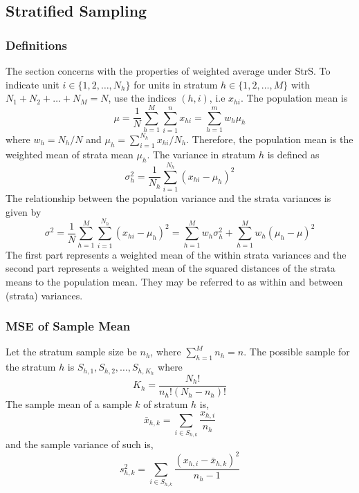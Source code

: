 \subsection{Stratified Sampling}
\subsubsection{Definitions}
The section concerns with the properties of weighted average under StrS. To indicate unit $i\in\{1,2,\ldots,N_h\}$ for units in stratum $h\in\{1,2,\ldots,M\}$ with $N_1+N_2+\ldots+N_M=N$, use the indices $(h,i)$, i.e 
$x_{hi}$. The population mean is
\begin{equation}
    \mu=\frac1N\sum_{h=1}^{M}\sum_{i=1}^{n}x_{hi}=\sum_{h=1}^{m}w_h\mu_h
\end{equation}
where $w_h=N_h/N$ and $\mu_h=\sum_{i=1}^{N_h}x_{hi}/N_h$. Therefore, the population mean is the weighted mean of strata mean $\mu_h$. The variance in stratum $h$ is defined as 
\begin{equation}
    \sigma^2_h=\frac{1}{N_h}\sum_{i=1}^{N_h}(x_{hi}-\mu_h)^2
\end{equation}
The relationship between the population variance and the strata variances is given by
\begin{equation}
    \sigma^2=\frac1N\sum_{h=1}^{M}\sum_{i=1}^{N_h}(x_{hi}-\mu_h)^2=\sum_{h=1}^{M}w_h\sigma^2_h+\sum_{h=1}^{M}w_h(\mu_h-\mu)^2
\end{equation}
The first part represents a weighted mean of the within strata variances and the second part represents a weighted mean of the squared distances of the strata means to the population mean. They may be referred to as 
within and between (strata) variances.

\subsubsection{MSE of Sample Mean}
Let the stratum sample size be $n_h$, where $\sum^M_{h=1}n_h=n$. The possible sample for the stratum $h$ is $S_{h,1},S_{h,2},\ldots,S_{h,K_h}$ where 
\begin{equation*}
    K_h = \frac{N_h!}{n_h!(N_h-n_h)!}
\end{equation*}
The sample mean of a sample $k$ of stratum $h$ is,
\begin{equation}
    \bar{x}_{h,k}=\sum_{i\in S_{h,k}}\frac{x_{h,i}}{n_h} 
\end{equation}
and the sample variance of such is,
\begin{equation}
    s^2_{h,k}=\sum_{i\in S_{h,k}}\frac{(x_{h,i}-\bar{x}_{h,k})^2}{n_h-1} 
\end{equation}

